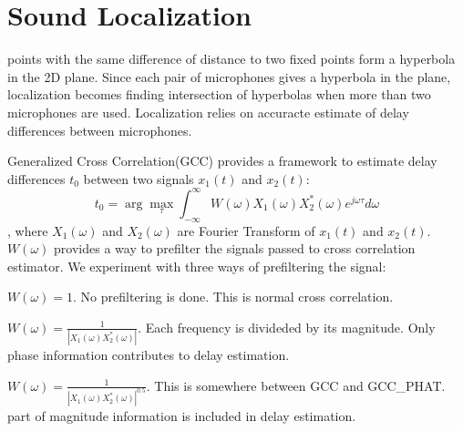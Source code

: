 \section{Sound Localization}
points with the same difference of distance to two fixed points form a hyperbola in the 2D plane. Since each pair of microphones gives a hyperbola in the plane, localization becomes finding intersection of hyperbolas when more than two microphones are used. Localization relies on accuracte estimate of delay differences between microphones.

Generalized Cross Correlation(GCC) provides a framework to estimate delay differences $t_0$ between two signals $x_1(t)$ and $x_2(t)$:
\begin{equation} \label{eq:gcc}
t_0 = \arg\max_{\tau} \int_{-\infty}^\infty W(\omega) X_1(\omega) X_2^{*}(\omega) e^{j\omega\tau} d\omega
\end{equation}
, where $X_1(\omega)$ and $X_2(\omega)$ are Fourier Transform of $x_1(t)$ and $x_2(t)$. $W(\omega)$ provides a way to prefilter the signals passed to cross correlation estimator. We experiment with three ways of prefiltering the signal:
\begin{description}
\item[GCC] $W(\omega) = 1$. No prefiltering is done. This is normal cross correlation.
\item[GCC\_PHAT] $W(\omega) = \frac{1}{\left|X_1(\omega)X_2^{*}(\omega)\right|}$. Each frequency is divideded by its magnitude. Only phase information contributes to delay estimation.
\item[GCC\_PHAT\_SQRT] $W(\omega) = \frac{1}{\left|X_1(\omega)X_2^*(\omega)\right|^{0.5}}$. This is somewhere between GCC and GCC\_PHAT. part of magnitude information is included in delay estimation.
\end{description}
